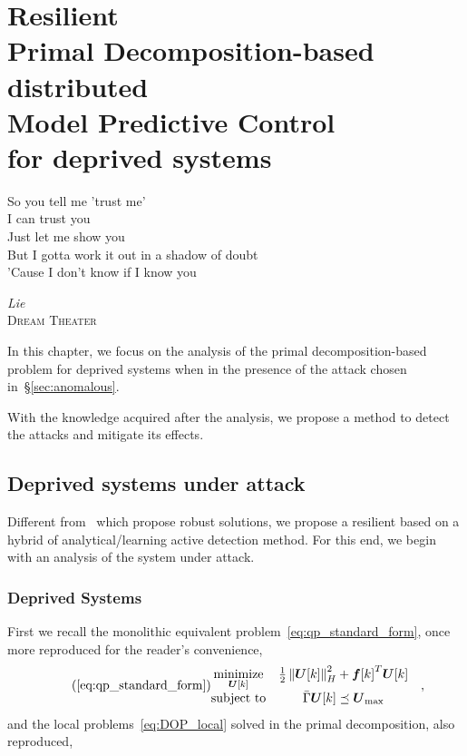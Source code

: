 \documentclass[../main.tex]{subfiles}
\begin{document}
\chapter[Resilient Primal Decomposition-based dMPC for deprived systems]{Resilient \\Primal Decomposition-based \\distributed \\Model Predictive Control\\ for deprived systems}\label{sec:safe_pddmpc_eq}
\epigraph{\centering So you tell me 'trust me' \\I can trust you\\ Just let me show you \\But I gotta work it out in a shadow of doubt \\'Cause I don't know if I know you}
{\textit{Lie}\\\textsc{Dream Theater}}

In this chapter, we focus on the analysis of the primal decomposition-based \dmpc{} problem for deprived systems when in the presence of the attack chosen in~\S\ref{sec:anomalous}.

With the knowledge acquired after the analysis, we propose a method to detect the attacks and mitigate its effects.

\minitoc


\section{Deprived systems under attack}\label{sec:analys-deprived-syst}

Different from~\cite{VelardeEtAl2018,MaestreEtAl2021} which propose robust solutions, we propose a resilient \dmpc{} based on a hybrid of analytical/learning active detection method.
For this end, we begin with an analysis of the system under attack.

\subsection{Deprived Systems}\label{sec:deprived-systems}
First we recall the monolithic \mpc{} equivalent problem~\eqref{eq:qp_standard_form}, once more reproduced for the reader's convenience,
\begin{equation}
  \label{eq:qp_standard_form_again}
  \tag{\ref*{eq:qp_standard_form}}
  \begin{aligned}
    \begin{matrix}
      \minimize\limits_{\vec{U}[k]} &
                                                 \frac{1}{2}\norm{\vec{U}[k]}^{2}_{H} + {\vec{f}[k]}^{T}\vec{U}[k] &\\
      \mathrm{subject~ to} &
                             \bar{\Gamma}\vec{U}[k]\preceq {\vec{U}}_{\text{max}}
    \end{matrix}
  \end{aligned},
\end{equation}
and the local problems~\eqref{eq:DOP_local} solved in the primal decomposition, also reproduced,
\end{document}
